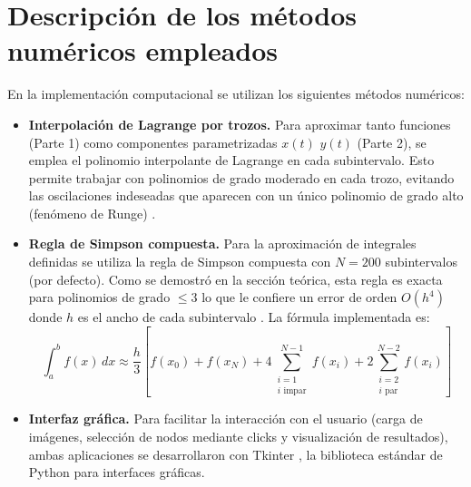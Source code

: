 \documentclass[12pt]{article}
\begin{document}
\section*{Descripción de los métodos numéricos empleados}

En la implementación computacional se utilizan los siguientes métodos numéricos:

\begin{itemize}
	\item \textbf{Interpolación de Lagrange por trozos.} Para aproximar tanto funciones (Parte 1) como componentes parametrizadas $x(t)$ $y(t)$ (Parte 2), se emplea el polinomio interpolante de Lagrange en cada subintervalo. Esto permite trabajar con polinomios de grado moderado en cada trozo, evitando las oscilaciones indeseadas que aparecen con un único polinomio de grado alto (fenómeno de Runge) \cite{cheney08}.

	\item \textbf{Regla de Simpson compuesta.} Para la aproximación de integrales definidas se utiliza la regla de Simpson compuesta con $N = 200$ subintervalos (por defecto). Como se demostró en la sección teórica, esta regla es exacta para polinomios de grado $\leq 3$ lo que le confiere un error de orden $O(h^4)$ donde $h$ es el ancho de cada subintervalo \cite{mathworld_simpson, burden02}. La fórmula implementada es:
	\[
	\int_a^b f(x)\,dx \approx \frac{h}{3}\left[f(x_0) + f(x_N) + 4\sum_{\substack{i=1 \\ i\text{ impar}}}^{N-1} f(x_i) + 2\sum_{\substack{i=2 \\ i\text{ par}}}^{N-2} f(x_i)\right]
	\]

	\item \textbf{Interfaz gráfica.} Para facilitar la interacción con el usuario (carga de imágenes, selección de nodos mediante clicks y visualización de resultados), ambas aplicaciones se desarrollaron con Tkinter \cite{tkinter}, la biblioteca estándar de Python para interfaces gráficas.
\end{itemize}




\end{document}
